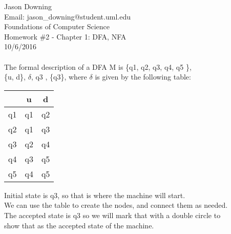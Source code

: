 \documentclass[12pt]{article}
\begin{document}
\noindent
Jason Downing \\
Email: jason\_downing@student.uml.edu \\
Foundations of Computer Science \\
Homework \#2 - Chapter 1: DFA, NFA\\
10/6/2016 \\


 \\
The formal description of a DFA M is \{q1, q2, q3, q4, q5 \}, \\
\{u, d\}, $\delta$, q3 , \{q3\}, where $\delta$  is given by the following table:
\begin{center}
\begin{tabular}{ c | c c }
 & u & d \\
\hline
 q1 & q1 & q2 \\ 
 q2 & q1 & q3 \\  
 q3 & q2 & q4 \\
 q4 & q3 & q5 \\
 q5 & q4 & q5
\end{tabular}
\end{center}

\noindent
Initial state is q3, so that is where the machine will start. \\
We can use the table to create the nodes, and connect them as needed. \\
The accepted state is q3 so we will mark that with a double circle to \\
show that as the accepted state of the machine. \\

\begin{center}
 \\
\end{center}
\end{document}
